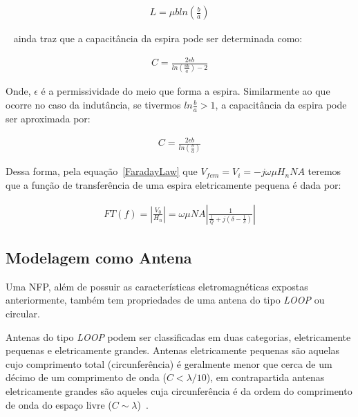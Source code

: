 \begin{eqnarray}
L = \mu b ln \left ( \frac{b}{a}  \right )
\end{eqnarray}

~ ainda traz que a capacitância da espira pode ser determinada como:

\begin{eqnarray}
C = \frac{2 \epsilon b}{ln \left ( \frac{8b}{a}  \right ) -2 } \nonumber
\end{eqnarray}

Onde, $\epsilon$ é a permissividade do meio que forma a espira. Similarmente ao que ocorre no caso da indutância, se tivermos $ln \frac{b}{a} > 1$, a capacitância da espira pode ser aproximada por:

\begin{eqnarray}
C = \frac{2 \epsilon b}{ln \left ( \frac{b}{a}  \right )}
\end{eqnarray}

Dessa forma, pela equação~\ref{FaradayLaw} que $V_{fem} = V_i  = -j\omega \mu H_nNA$ teremos que a função de transferência de uma espira eletricamente pequena é dada por:

\begin{eqnarray}
FT(f) = \left | \frac{V_0}{H_n} \right | = \omega \mu NA \left | \frac{1}{\frac{1}{Q} + j \left (\delta - \frac{1}{\delta} \right )} \right |
\end{eqnarray}


\subsection{Modelagem como Antena}
Uma NFP, além de possuir as características eletromagnéticas expostas anteriormente, também tem propriedades de uma antena do tipo \textit{LOOP} ou circular.

Antenas do tipo \textit{LOOP} podem ser classificadas em duas categorias, eletricamente pequenas e eletricamente grandes. Antenas eletricamente pequenas são aquelas cujo comprimento total (circunferência) é geralmente menor que cerca de um décimo de um comprimento de onda ($C < \lambda / 10$), em contrapartida antenas eletricamente grandes são aqueles cuja circunferência é da ordem do comprimento de onda do espaço livre ($C \sim \lambda $)~\cite[p.~232]{balanis2005}.

